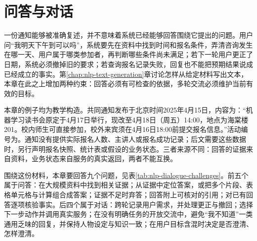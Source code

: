 \chapter{问答与对话}
\label{chap:nlp-question-answering-dialogue}

一份通知能够被准确复述，并不意味着系统已经能够回答围绕它提出的问题。用户问“我明天下午到可以吗”，系统要先在资料中找到时间和报名条件，弄清咨询发生在哪一天、用户属于哪类参加者，再判断哪些条件尚未满足；若下一轮用户更正了日期，系统必须撤掉旧的要求；若查询报名记录失败，回复也不能把预期结果说成已经成立的事实。第\ref{chap:nlp-text-generation}章讨论怎样从给定材料写出文本，本章在此之上增加两种约束：回答必须有可检查的依据，多轮交流必须维护当前有效的目标。

本章的例子均为教学构造。共同通知发布于北京时间2025年4月15日，内容为：“机器学习读书会原定于4月17日举行，现改至4月18日（周五）14:00，地点为海棠楼201。校内师生可直接参加，校外来宾须在4月16日18:00前提交报名信息。”活动编号为。通知没有提供实际报名人数、主讲人或报名成功记录；后文需要这些数据时，另行声明报名快照、统计表或假设的业务状态。三者来源不同：回答的证据来自资料，业务状态来自服务的真实返回，两者不能互换。

围绕这份材料，本章要回答九个问题，见表\ref{tab:nlp-dialogue-challenges}。前五个属于问答：在大规模资料中找到相关证据；从证据中定位答案，或把多个片段、表格单元格与计算组合成答案；证据不足时弃答；回答附上可核对的引用；对已有回答逐项核验事实。后四个属于对话：跨轮记录用户需求，并处理更正与撤回；选择下一步动作并调用真实服务；在没有明确任务的开放交流中，避免“我不知道”一类通用乏味的回复，并保持人物设定与知识一致；在用户目标含混时决定是否澄清、怎样澄清。

